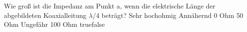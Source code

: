     {Wie groß ist die Impedanz am Punkt a, wenn die elektrische Länge der abgebildeten Koaxialleitung $\lambda$/4 beträgt?}
    {Sehr hochohmig}
    {Annähernd 0 Ohm}
    {50 Ohm}
    {Ungefähr 100 Ohm}
    {true}{false}